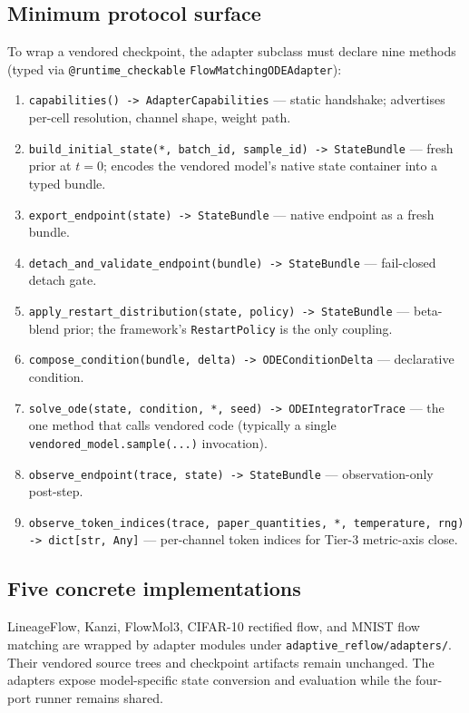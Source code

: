 \documentclass[journal,twocolumn,final]{IEEEtran}
\begin{document}
\subsection{Minimum protocol surface}

To wrap a vendored checkpoint, the adapter subclass must declare nine methods (typed via \texttt{@runtime\_checkable} \texttt{FlowMatchingODEAdapter}):

\begin{enumerate}
\setlength{\itemsep}{2pt}
\item \texttt{capabilities() -> AdapterCapabilities} --- static handshake; advertises per-cell resolution, channel shape, weight path.

\item \texttt{build\_initial\_state(*, batch\_id, sample\_id) -> StateBundle} --- fresh prior at $t = 0$; encodes the vendored model's native state container into a typed bundle.

\item \texttt{export\_endpoint(state) -> StateBundle} --- native endpoint as a fresh bundle.

\item \texttt{detach\_and\_validate\_endpoint(bundle) -> StateBundle} --- fail-closed detach gate.

\item \texttt{apply\_restart\_distribution(state, policy) -> StateBundle} --- beta-blend prior; the framework's \texttt{RestartPolicy} is the only coupling.

\item \texttt{compose\_condition(bundle, delta) -> ODEConditionDelta} --- declarative condition.

\item \texttt{solve\_ode(state, condition, *, seed) -> ODEIntegratorTrace} --- the one method that calls vendored code (typically a single \texttt{vendored\_model.sample(...)} invocation).

\item \texttt{observe\_endpoint(trace, state) -> StateBundle} --- observation-only post-step.

\item \texttt{observe\_token\_indices(trace, paper\_quantities, *, temperature, rng) -> dict[str, Any]} --- per-channel token indices for Tier-3 metric-axis close.
\end{enumerate}

\subsection{Five concrete implementations}
LineageFlow, Kanzi, FlowMol3, CIFAR-10 rectified flow, and MNIST flow matching are wrapped by adapter modules under \texttt{adaptive\_reflow/adapters/}. Their vendored source trees and checkpoint artifacts remain unchanged. The adapters expose model-specific state conversion and evaluation while the four-port runner remains shared.
\end{document}
